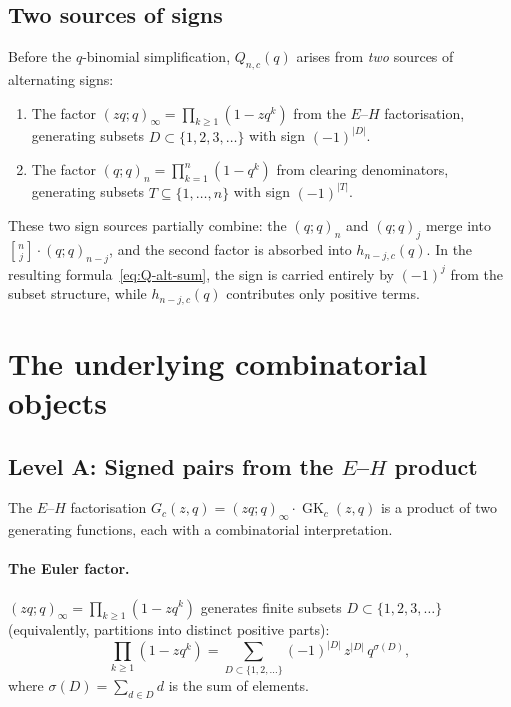 \documentclass[11pt]{article}
\newcommand{\GK}{\operatorname{GK}}
\newcommand{\qpoch}[2]{(#1;#2)_\infty}
\newcommand{\qpochn}[3]{(#1;#2)_{#3}}
\newcommand{\qbin}[2]{\genfrac{[}{]}{0pt}{}{#1}{#2}}
\theoremstyle{plain}
\theoremstyle{definition}
\begin{document}
\subsection{Two sources of signs}

Before the $q$-binomial simplification, $Q_{n,c}(q)$ arises from
\emph{two} sources of alternating signs:

\begin{enumerate}
  \item The factor $\qpoch{zq}{q} = \prod_{k \geq 1}(1 - zq^k)$
    from the $E$--$H$ factorisation, generating subsets
    $D \subset \{1, 2, 3, \ldots\}$ with sign $(-1)^{|D|}$.
  \item The factor $\qpochn{q}{q}{n} = \prod_{k=1}^{n}(1 - q^k)$
    from clearing denominators, generating subsets
    $T \subseteq \{1, \ldots, n\}$ with sign $(-1)^{|T|}$.
\end{enumerate}

These two sign sources partially combine: the $\qpochn{q}{q}{n}$
and $\qpochn{q}{q}{j}$ merge into
$\qbin{n}{j} \cdot \qpochn{q}{q}{n-j}$, and the second factor is
absorbed into $h_{n-j,c}(q)$.  In the resulting
formula~\eqref{eq:Q-alt-sum}, the sign is carried entirely by
$(-1)^j$ from the subset structure, while $h_{n-j,c}(q)$ contributes
only positive terms.


\section{The underlying combinatorial objects}
\label{sec:objects}

\subsection{Level A: Signed pairs from the $E$--$H$ product}

The $E$--$H$ factorisation $G_c(z,q) = \qpoch{zq}{q} \cdot \GK_c(z,q)$
is a product of two generating functions, each with a combinatorial
interpretation.

\paragraph{The Euler factor.}
$\qpoch{zq}{q} = \prod_{k \geq 1}(1 - zq^k)$ generates
finite subsets $D \subset \{1, 2, 3, \ldots\}$ (equivalently,
partitions into distinct positive parts):
\[
  \prod_{k \geq 1}(1 - zq^k)
  = \sum_{D \subset \{1,2,\ldots\}} (-1)^{|D|}\, z^{|D|}\, q^{\sigma(D)},
\]
where $\sigma(D) = \sum_{d \in D} d$ is the sum of elements.
\end{document}
